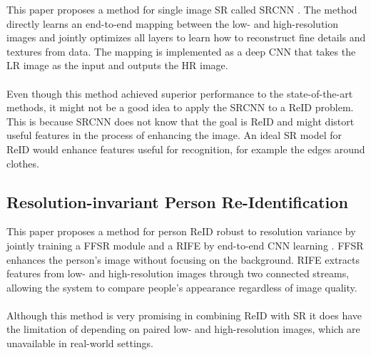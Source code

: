 This paper proposes a method for single image \ac{SR} called \ac{SRCNN} \cite{SRCNN}. The method directly learns an end-to-end mapping between the low- and high-resolution images and jointly optimizes all layers to learn how to reconstruct fine details and textures from data. The mapping is implemented as a deep \ac{CNN} that takes the \ac{LR} image as the input and outputs the \ac{HR} image.
\\\\
Even though this method achieved superior performance to the state-of-the-art methods, it might not be a good idea to apply the \ac{SRCNN} to a \ac{ReID} problem. This is because \ac{SRCNN} does not know that the goal is \ac{ReID} and might distort useful features in the process of enhancing the image. An ideal \ac{SR} model for \ac{ReID} would enhance features useful for recognition, for example the edges around clothes. 	

\subsection{Resolution-invariant Person Re-Identification}

This paper proposes a method for person \ac{ReID} robust to resolution variance by jointly training a \ac{FFSR} module and a \ac{RIFE} by end-to-end \ac{CNN} learning \cite{FFSR}. \ac{FFSR} enhances the person’s image without focusing on the background. \ac{RIFE} extracts features from low- and high-resolution images through two connected streams, allowing the system to compare people’s appearance regardless of image quality. 
\\\\
Although this method is very promising in combining \ac{ReID} with \ac{SR} it does have the limitation of depending on paired low- and high-resolution images, which are unavailable in real-world settings. 
